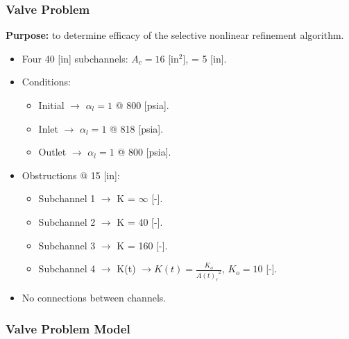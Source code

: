 \documentclass[compress,xcolor=table]{beamer}
\begin{document}
\begin{frame}
\frametitle{Valve Problem}

\textbf{Purpose:} to determine efficacy of the selective nonlinear refinement algorithm.

\begin{itemize}
\item{Four 40 [in] subchannels: $A_{c} = 16$ [in$^{2}$], \dx{} = 5 [in].}
\item{Conditions:
	\begin{itemize}
	\item{Initial $\rightarrow$ $\alpha_{l} = 1$ @ 800 [psia].}
	\item{Inlet $\rightarrow$ $\alpha_{l} = 1$ @ 818 [psia].}
	\item{Outlet $\rightarrow$ $\alpha_{l} = 1$ @ 800 [psia].}
	\end{itemize}
}
\item{Obstructions @ 15 [in]:
\begin{itemize}
	\item{Subchannel 1 $\rightarrow$ K = $\infty$ [-].}
	\item{Subchannel 2 $\rightarrow$ K = 40 [-].}
	\item{Subchannel 3 $\rightarrow$ K = 160 [-].}
	\item{Subchannel 4 $\rightarrow$ K(t) $\rightarrow K(t) = \frac{K_{o}}{{A(t)_r}^2}$, $K_{o} = 10$ [-].}
\end{itemize}
}
\item{No connections between channels.}
\end{itemize}

\end{frame}
\begin{frame}
\frametitle{Valve Problem Model}

\begin{center}
\resizebox{0.75\textwidth}{0.75\textheight}{

}
\end{center}

\end{frame}
\end{document}
